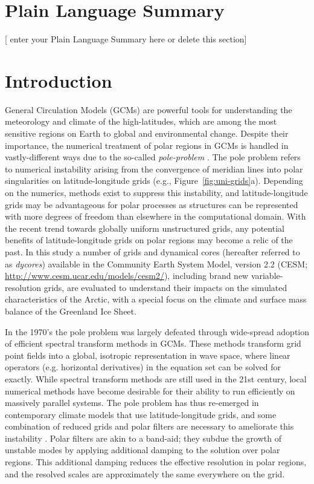 \documentclass[draft]{agujournal2019}
\begin{document}
\section*{Plain Language Summary}
[ enter your Plain Language Summary here or delete this section]


%
%

\section{Introduction}

General Circulation Models (GCMs) are powerful tools for understanding the meteorology and climate of the high-latitudes, which are among the most sensitive regions on Earth to global and environmental change. Despite their importance, the numerical treatment of polar regions in GCMs is handled in vastly-different ways due to the so-called \textit{pole-problem} \cite{W2007JMSJ}. The pole problem refers to numerical instability arising from the convergence of meridian lines into polar singularities on latitude-longitude grids (e.g., Figure~\ref{fig:uni-grids}a). Depending on the numerics, methods exist to suppress this instability, and latitude-longitude grids may be advantageous for polar processes as structures can be represented with more degrees of freedom than elsewhere in the computational domain. With the recent trend towards globally uniform unstructured grids, any potential benefits of latitude-longitude grids on polar regions may become a relic of the past. In this study a number of grids and dynamical cores (hereafter referred to as \textit{dycores}) available in the Community Earth System Model, version 2.2 (CESM; \url{http://www.cesm.ucar.edu/models/cesm2/}), including brand new variable-resolution grids, are evaluated to understand their impacts on the simulated characteristics of the Arctic, with a special focus on the climate and surface mass balance of the Greenland Ice Sheet.

In the 1970's the pole problem was largely defeated through wide-spread adoption of efficient spectral transform methods in GCMs. These methods transform grid point fields into a global, isotropic representation in wave space, where linear operators (e.g. horizontal derivatives) in the equation set can be solved for exactly. While spectral transform methods are still used in the 21st century, local numerical methods have become desirable for their ability to run efficiently on massively parallel systems. The pole problem has thus re-emerged in contemporary climate models that use latitude-longitude grids, and some combination of reduced grids and polar filters are necessary to ameliorate this instability \cite{JW2010LNCSE}. Polar filters are akin to a band-aid; they subdue the growth of unstable modes by applying additional damping to the solution over polar regions. This additional damping reduces the effective resolution in polar regions, and the resolved scales are approximately the same everywhere on the grid.
\end{document}
